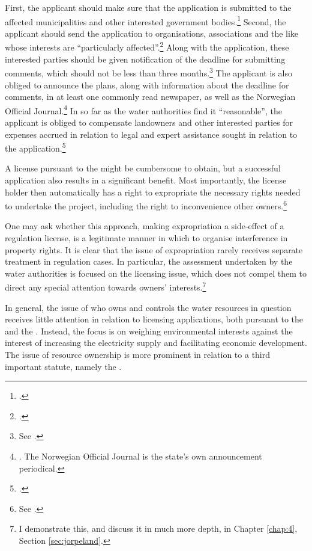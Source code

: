 First, the applicant should make sure that the application is submitted to the affected municipalities and other interested government bodies.\footcite[6]{wra17} Second, the applicant should send the application to organisations, associations and the like whose interests are ``particularly affected''.\footcite[6]{wra17} Along with the application, these interested parties should be given notification of the deadline for submitting comments, which should not be less than three months.\footnote{See \cite[6]{wra17}.} The applicant is also obliged to announce the plans, along with information about the deadline for comments, in at least one commonly read newspaper, as well as the Norwegian Official Journal.\footnote{\cite[6]{wra17}. The Norwegian Official Journal is the state's own announcement periodical.} In so far as the water authorities find it ``reasonable'', the applicant is obliged to compensate landowners and other interested parties for expenses accrued in relation to legal and expert assistance sought in relation to the application.\footcite[6]{wra17}

A license pursuant to the \cite{wra17} might be cumbersome to obtain, but a successful application also results in a significant benefit. Most importantly, the license holder then automatically has a right to expropriate the necessary rights needed to undertake the project, including the right to inconvenience other owners.\footnote{See \cite[16]{wra17}.} 

One may ask whether this approach, making expropriation a side-effect of a regulation license, is a legitimate manner in which to organise interference in property rights. It is clear that the issue of expropriation rarely receives separate treatment in regulation cases. In particular, the assessment undertaken by the water authorities is focused on the licensing issue, which does not compel them to direct any special attention towards owners' interests.\footnote{I demonstrate this, and discuss it in much more depth, in Chapter \ref{chap:4}, Section \ref{sec:jorpeland}.}

In general, the issue of who owns and controls the water resources in question receives little attention in relation to licensing applications, both pursuant to the \cite{wra17} and the \cite{wra00}. Instead, the focus is on weighing environmental interests against the interest of increasing the electricity supply and facilitating economic development. The issue of resource ownership is more prominent in relation to a third important statute, namely the \cite{ica17}.

